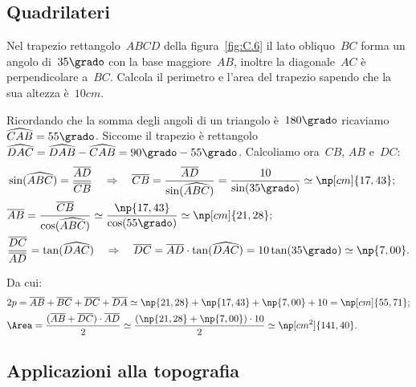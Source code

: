 \ovalbox{\risolvii \ref{ese:C.22}, \ref{ese:C.23}, \ref{ese:C.24}, \ref{ese:C.25}}

\subsection{Quadrilateri}

\begin{exrig}\vspace{1.10ex}
 \begin{esempio}
Nel trapezio rettangolo~$ABCD$ della figura~\ref{fig:C.6} il lato obliquo~$BC$ forma un angolo di~$35\grado$ con la base maggiore~$AB$, inoltre la diagonale~$AC$
è perpendicolare a~$BC$. Calcola il perimetro e l'area del trapezio sapendo che la sua altezza è~$10\unit{cm}$.

Ricordando che la somma degli angoli di un triangolo è~$180\grado$ ricaviamo~$\widehat{CAB}=55\grado$.
Siccome il trapezio è rettangolo
$\widehat{DAC}=\widehat{DAB}-\widehat{CAB}=90\grado-55\grado$.
Calcoliamo ora~$CB$, $AB$ e~$DC$:
\begin{align*}
&\sin(\widehat{ABC})=\frac{\overline{AD}}{\overline{CB}} \quad\Rightarrow\quad
    \overline{CB}=\frac{\overline{AD}}{\sin(\widehat{ABC})}=\frac{10}{\sin(35\grado)}\simeq \np[cm]{17,43};\\
&\overline{AB}=\frac{\overline{CB}}{\cos(\widehat{ABC})}\simeq \frac{\np{17,43}}{\cos(55\grado)}\simeq \np[cm]{21,28};\\
&\frac{\overline{DC}}{\overline{AD}}=\tan(\widehat{DAC}) \quad\Rightarrow\quad \overline{DC}=\overline{AD}\cdot\tan(\widehat{DAC})=10\tan(35\grado)\simeq \np{7,00}.
\end{align*}

Da cui:
\begin{align*}
&2p=\overline{AB}+\overline{BC}+\overline{DC}+\overline{DA}\simeq \np{21,28}+\np{17,43}+\np{7,00}+10 = \np[cm]{55,71};\\
&\Area=\frac{(\overline{AB}+\overline{DC})\cdot\overline{AD}}{2}\simeq \frac{(\np{21,28}+\np{7,00})\cdot 10}{2}\simeq \np[cm^2]{141,40}.
\end{align*}
 \end{esempio}
\end{exrig}

\ovalbox{\risolvii \ref{ese:C.26}, \ref{ese:C.27}, \ref{ese:C.28}, \ref{ese:C.29},\ref{ese:C.30}, \ref{ese:C.31}, \ref{ese:C.32}, \ref{ese:C.33}}

\subsection{Applicazioni alla topografia}


